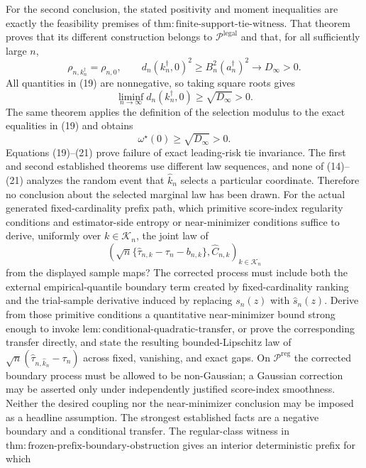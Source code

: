 For the second conclusion, the stated positivity and moment inequalities are exactly the feasibility premises of \(\mathrm{thm:finite\text{-}support\text{-}tie\text{-}witness}\).  That theorem proves that its different construction belongs to \(\mathcal P^{\mathrm{legal}}\) and that, for all sufficiently large \(n\),
\[
 \rho_{n,k_n^{\dagger}}=\rho_{n,0},
 \qquad
 d_n(k_n^{\dagger},0)^2
 \geq B_n^2(a_n^{\dagger})^2
 \longrightarrow D_\infty>0. \tag{19}
\]
All quantities in (19) are nonnegative, so taking square roots gives
\[
 \liminf_{n\to\infty}d_n(k_n^{\dagger},0)
 \geq\sqrt{D_\infty}>0. \tag{20}
\]
The same theorem applies the definition of the selection modulus to the exact equalities in (19) and obtains
\[
 \omega^{\star}(0)\geq\sqrt{D_\infty}>0. \tag{21}
\]
Equations (19)--(21) prove failure of exact leading-risk tie invariance.  The first and second established theorems use different law sequences, and none of (14)--(21) analyzes the random event that \(\widehat k_n\) selects a particular coordinate.  Therefore no conclusion about the selected marginal law has been drawn.
For the actual generated fixed-cardinality prefix path, which primitive score-index regularity conditions and estimator-side entropy or near-minimizer conditions suffice to derive, uniformly over \(k\in\mathcal K_n\), the joint law of
\[
 \left(
 \sqrt n\{\widehat\tau_{n,k}-\tau_n-b_{n,k}\},
 \widehat C_{n,k}
 \right)_{k\in\mathcal K_n}
\]
from the displayed sample maps?  The corrected process must include both the external empirical-quantile boundary term created by fixed-cardinality ranking and the trial-sample derivative induced by replacing \(s_n(z)\) with \(\widehat s_n(z)\).  Derive from those primitive conditions a quantitative near-minimizer bound strong enough to invoke \(\mathrm{lem:conditional\text{-}quadratic\text{-}transfer}\), or prove the corresponding transfer directly, and state the resulting bounded-Lipschitz law of \(\sqrt n(\widehat\tau_{n,\widehat k_n}-\tau_n)\) across fixed, vanishing, and exact gaps.  On \(\mathcal P^{\mathrm{reg}}\) the corrected boundary process must be allowed to be non-Gaussian; a Gaussian correction may be asserted only under independently justified score-index smoothness.  Neither the desired coupling nor the near-minimizer conclusion may be imposed as a headline assumption.
The strongest established facts are a negative boundary and a conditional transfer.  The regular-class witness in \(\mathrm{thm:frozen\text{-}prefix\text{-}boundary\text{-}obstruction}\) gives an interior deterministic prefix for which
